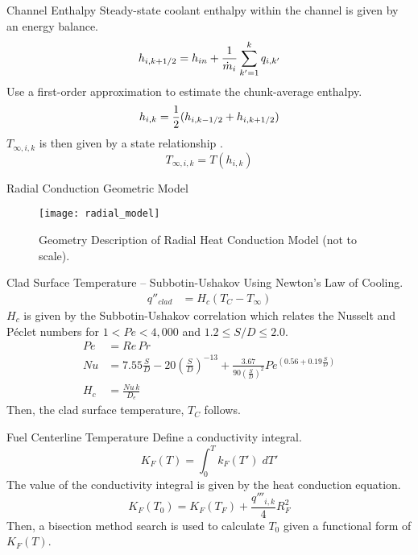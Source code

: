 \begin{frame}{Channel Enthalpy}
  Steady-state coolant enthalpy within the channel is given by an energy
  balance.
  \begin{equation}
    h_{i,k+1/2} = h_{in} + \frac{1}{\dot{m}_i} \sum_{k'=1}^{k} q_{i,k'}
  \end{equation}
  Use a first-order approximation to estimate the chunk-average enthalpy.
  \begin{equation}
    h_{i,k} = \frac{1}{2} (h_{i,k-1/2}+h_{i,k+1/2})
  \end{equation}
  $T_{\infty,i,k}$ is then given by a state relationship \cite{sodiumProp}.
  \begin{equation}
    T_{\infty,i,k} = T(h_{i,k})
  \end{equation}
\end{frame}

\begin{frame}{Radial Conduction Geometric Model}
  \begin{figure}
    \centering
    \texttt{[image: radial\_model]}
    \caption{Geometry Description of Radial Heat Conduction Model (not to
      scale).}
    \label{fig:radial_model}
  \end{figure}
\end{frame}

\begin{frame}{Clad Surface Temperature -- Subbotin-Ushakov}
  Using Newton's Law of Cooling.
  \begin{align}
    q''_{clad} &= H_c (T_C - T_{\infty}) %
  \end{align}
  $H_c$ is given by the Subbotin-Ushakov correlation \cite{subbotinUshakov}
  which relates the Nusselt and P\'eclet numbers for ${1 < Pe < 4,000}$ and 
  ${ 1.2 \le S/D \le 2.0 }$.
  \begin{align}
    Pe &= Re \, Pr \\
    \label{eq:subbotinUshakov}
    Nu &= 7.55 \frac{S}{D} - 20 \left(\frac{S}{D}\right)^{-13} + 
      \frac{3.67}{90\left(\frac{S}{D}\right)^{2}}
      Pe^{\left(0.56 + 0.19 \frac{S}{D}\right)} \\
    H_c &= \frac{N\!u \, k}{D_e} %
  \end{align}
  Then, the clad surface temperature, $T_C$ follows.
\end{frame}

\begin{frame}{Fuel Centerline Temperature}
  Define a conductivity integral.
  \begin{equation}
    \label{eq:conductivity_integral}
    K_F(T) = \int_0^T k_F(T') \; dT'
  \end{equation}
  The value of the conductivity integral is given by the heat conduction
  equation.
  \begin{equation}
    \label{eq:tcl_conductivity_integral}
    K_F(T_0) = K_F(T_F) + \frac{q'''_{i,k}}{4} R_F^2
  \end{equation}
  Then, a bisection method search is used to calculate $T_0$ given a functional
  form of $K_F(T)$.
\end{frame}

